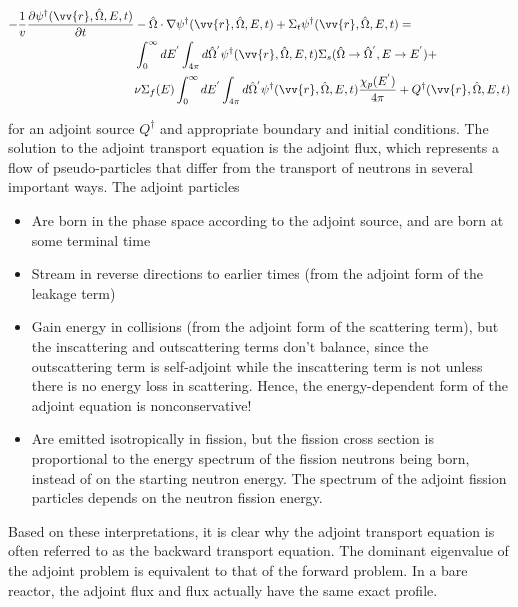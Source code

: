 \documentclass[10pt]{article}
\begin{document}
\begin{flushleft}
\begin{equation} %
\begin{aligned}
-\frac{1}{v}\frac{\partial\psi^\dagger(\vv{r},\hat{\Omega},E,t)}{\partial t}
& -\hat{\Omega}\cdot\nabla\psi^\dagger(\vv{r},\hat{\Omega},E,t)
+\Sigma_t\psi^\dagger(\vv{r},\hat{\Omega},E,t)=\\
& \int_0^\infty dE^{'}\int_{4\pi}d\hat{\Omega}^{'}\psi^\dagger(\vv{r},\hat{\Omega},E,t)\Sigma_s(\hat{\Omega}\rightarrow\hat{\Omega}^{'}, E\rightarrow E^{'})+\\
& \nu\Sigma_f(E)\int_0^\infty dE^{'}\int_{4\pi}d\hat{\Omega}^{'}\psi^\dagger(\vv{r},\hat{\Omega},E,t)\frac{\chi_p(E^{'})}{4\pi} + Q^\dagger(\vv{r},\hat{\Omega},E,t)\\
\end{aligned}
\end{equation}

for an adjoint source \(Q^\dagger\) and appropriate boundary and initial conditions. The solution to the adjoint transport equation is the adjoint flux, which represents a flow of pseudo-particles that differ from the transport of neutrons in several important ways. The adjoint particles

\begin{itemize}
\item Are born in the phase space according to the adjoint source, and are born at some terminal time
\item Stream in reverse directions to earlier times (from the adjoint form of the leakage term)
\item Gain energy in collisions (from the adjoint form of the scattering term), but the inscattering and outscattering terms don't balance, since the outscattering term is self-adjoint while the inscattering term is not unless there is no energy loss in scattering. Hence, the energy-dependent form of the adjoint equation is nonconservative!
\item Are emitted isotropically in fission, but the fission cross section is proportional to the energy spectrum of the fission neutrons being born, instead of on the starting neutron energy. The spectrum of the adjoint fission particles depends on the neutron fission energy.
\end{itemize}

Based on these interpretations, it is clear why the adjoint transport equation is often referred to as the backward transport equation. The dominant eigenvalue of the adjoint problem is equivalent to that of the forward problem. In a bare reactor, the adjoint flux and flux actually have the same exact profile. 












\end{flushleft}
\end{document}
